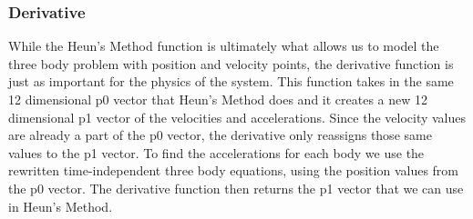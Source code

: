 \documentclass{article}
\begin{document}
\subsubsection{Derivative}
While the Heun’s Method function is ultimately what allows us to model the three body problem with position and velocity points, the derivative function is just as important for the physics of the system. This function takes in the same 12 dimensional p0 vector that Heun’s Method does and it creates a new 12 dimensional p1 vector of the velocities and accelerations. Since the velocity values are already a part of the p0 vector, the derivative only reassigns those same values to the p1 vector. To find the accelerations for each body we use the rewritten time-independent three body equations, using the position values from the p0 vector. The derivative function then returns the p1 vector that we can use in Heun’s Method. 
\end{document}
